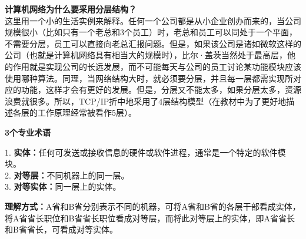 \textbf{{计算机网络为什么要采用分层结构？}}\\
这里用一个小的生活实例来解释。任何一个公司都是从小企业创办而来的，当公司规模很小（比如只有一个老总和3个员工）时，老总和员工可以同处于一个平面，不需要分层，员工可以直接向老总汇报问题。但是，如果该公司是诸如微软这样的公司（也就是计算机网络具有相当大的规模时），比尔·盖茨当然处于最高层，他的作用就是实现公司的长远发展，而不可能每天与公司的员工讨论某功能模块应该使用哪种算法。同理，当网络结构大时，就必须要分层，并且每一层都需实现所对应的功能，这样才会有更好的发展。但是，分层又不能太多，如果分层太多，资源浪费就很多。所以，TCP/IP折中地采用了4层结构模型（在教材中为了更好地描述各层的工作原理经常被看作5层）。

{\textbf{3个专业术语}}

1.
\textbf{实体：}任何可发送或接收信息的硬件或软件进程，通常是一个特定的软件模块。\\
2. \textbf{对等层：}不同机器上的同一层。\\
3. \textbf{对等实体：}同一层上的实体。

\textbf{理解方式：}{A省和B省分别表示不同的机器，可将A省和B省的各层干部看成实体，将A省省长职位和B省省长职位看成对等层，而将此对等层上的实体，即A省省长和B省省长，可看成对等实体。}

